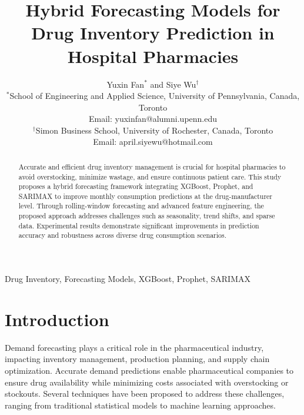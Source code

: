 \documentclass[journal]{IEEEtran}
\begin{document}
\title{Hybrid Forecasting Models for Drug Inventory Prediction in Hospital Pharmacies}

\author{Yuxin Fan$^{*}$ and Siye Wu$^{\dagger}$ \\
$^{*}$School of Engineering and Applied Science, University of Pennsylvania, Canada, Toronto \\
Email: yuxinfan@alumni.upenn.edu \\
$^{\dagger}$Simon Business School, University of Rochester, Canada, Toronto \\
Email: april.siyewu@hotmail.com}

\maketitle

\begin{abstract}
Accurate and efficient drug inventory management is crucial for hospital pharmacies to avoid overstocking, minimize wastage, and ensure continuous patient care. This study proposes a hybrid forecasting framework integrating XGBoost, Prophet, and SARIMAX to improve monthly consumption predictions at the drug-manufacturer level. Through rolling-window forecasting and advanced feature engineering, the proposed approach addresses challenges such as seasonality, trend shifts, and sparse data. Experimental results demonstrate significant improvements in prediction accuracy and robustness across diverse drug consumption scenarios.
\end{abstract}

\begin{IEEEkeywords}
Drug Inventory, Forecasting Models, XGBoost, Prophet, SARIMAX
\end{IEEEkeywords}


\section{Introduction}

Demand forecasting plays a critical role in the pharmaceutical industry, impacting inventory management, production planning, and supply chain optimization. Accurate demand predictions enable pharmaceutical companies to ensure drug availability while minimizing costs associated with overstocking or stockouts. Several techniques have been proposed to address these challenges, ranging from traditional statistical models to machine learning approaches.
\end{document}
